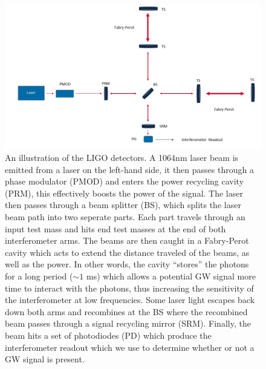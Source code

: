 \begin{figure}
    \centering
    \includegraphics[width=\linewidth]{figures/Interferometer_sketch_figure.png}
    \caption[Illustration of the \ac{LIGO} detectors.]{An illustration of the \ac{LIGO} detectors. A 1064nm laser beam is emitted from a laser on the left-hand side, it then passes through a phase modulator (PMOD) and enters the power recycling cavity (PRM), this effectively boosts the power of the signal. The laser then passes through a beam splitter (BS), which splits the laser beam path into two seperate parts. Each part travels through an input test mass and hits end test masses at the end of both interferometer arms. The beams are then caught in a Fabry-Perot cavity which acts to extend the distance traveled of the beams, as well as the power. In other words, the cavity ``stores'' the photons for a long period ($\sim1$ ms) which allows a potential \ac{GW} signal more time to interact with the photons, thus increasing the sensitivity of the interferometer at low frequencies. Some laser light escapes back down both arms and recombines at the BS where the recombined beam passes through a signal recycling mirror (SRM). Finally, the beam hits a set of photodiodes (PD) which produce the interferometer readout which we use to determine whether or not a \ac{GW} signal is present.}
    \label{fig:detector_schematic}
\end{figure}

